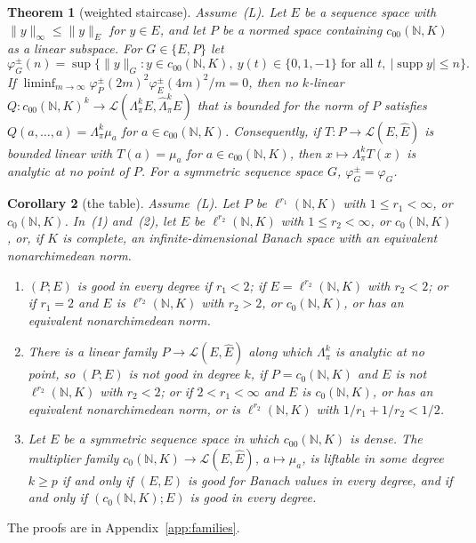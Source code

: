 \documentclass[11pt]{amsart}
\newtheorem{theorem}{Theorem}[section]
\newtheorem{corollary}[theorem]{Corollary}
\theoremstyle{definition}
\theoremstyle{remark}
\numberwithin{equation}{section}
\newcommand{\N}{\mathbb N}
\newcommand{\cL}{\mathcal L}
\newcommand{\abs}[1]{\lvert #1\rvert}
\newcommand{\norm}[1]{\lVert #1\rVert}
\theoremstyle{plain}
\theoremstyle{definition}
\theoremstyle{plain}
\newcommand{\hLambda}{\widehat\Lambda}
\begin{document}
\begin{theorem}[weighted staircase]\label{fam2:thm:staircase}
Assume~\textup{(L)}. Let $E$ be a sequence space with $\norm y_\infty\le\norm y_E$ for $y\in E$, and let $P$ be a normed
space containing $c_{00}(\N,K)$ as a linear subspace. For $G\in\{E,P\}$ let
\[
 \varphi^\pm_G(n)=\sup\bigl\{\norm y_G:y\in c_{00}(\N,K),\ y(t)\in\{0,1,-1\}\text{ for all }t,\
 \abs{\operatorname{supp}y}\le n\bigr\}.
\]
If $\liminf_{m\to\infty}\varphi^\pm_P(2m)^2\varphi^\pm_E(4m)^2/m=0$, then no $k$-linear
$Q\colon c_{00}(\N,K)^k\to\cL(\Lambda^k_\pi E,\hLambda^k_\pi E)$ that is bounded for the norm of $P$ satisfies
$Q(a,\dots,a)=\Lambda^k_\pi\mu_a$ for $a\in c_{00}(\N,K)$. Consequently, if $T\colon P\to\cL(E,\widehat E)$ is bounded
linear with $T(a)=\mu_a$ for $a\in c_{00}(\N,K)$, then $x\mapsto\Lambda^k_\pi T(x)$ is analytic at no point of $P$. For a
symmetric sequence space $G$, $\varphi^\pm_G=\varphi_G$.
\end{theorem}

\begin{corollary}[the table]\label{fam2:cor:table}
Assume~\textup{(L)}. Let $P$ be $\ell^{r_1}(\N,K)$ with $1\le r_1<\infty$, or $c_0(\N,K)$. In~(1) and~(2), let $E$ be
$\ell^{r_2}(\N,K)$ with $1\le r_2<\infty$, or $c_0(\N,K)$, or, if $K$ is complete, an infinite-dimensional Banach space with
an equivalent nonarchimedean norm.
\begin{enumerate}
\item $(P;E)$ is good in every degree if $r_1<2$; if $E=\ell^{r_2}(\N,K)$ with $r_2<2$; or if $r_1=2$ and $E$ is
$\ell^{r_2}(\N,K)$ with $r_2>2$, or $c_0(\N,K)$, or has an equivalent nonarchimedean norm.
\item There is a linear family $P\to\cL(E,\widehat E)$ along which $\Lambda^k_\pi$ is analytic at no point, so $(P;E)$ is
not good in degree $k$, if $P=c_0(\N,K)$ and $E$ is not $\ell^{r_2}(\N,K)$ with $r_2<2$; or if $2<r_1<\infty$ and $E$ is
$c_0(\N,K)$, or has an equivalent nonarchimedean norm, or is $\ell^{r_2}(\N,K)$ with $1/r_1+1/r_2<1/2$.
\item Let $E$ be a symmetric sequence space in which $c_{00}(\N,K)$ is dense. The multiplier family
$c_0(\N,K)\to\cL(E,\widehat E)$, $a\mapsto\mu_a$, is liftable in some degree $k\ge p$ if and only if $(E,E)$ is good for
Banach values in every degree, and if and only if $(c_0(\N,K);E)$ is good in every degree.
\end{enumerate}
\end{corollary}

The proofs are in Appendix~\ref{app:families}.
\end{document}
